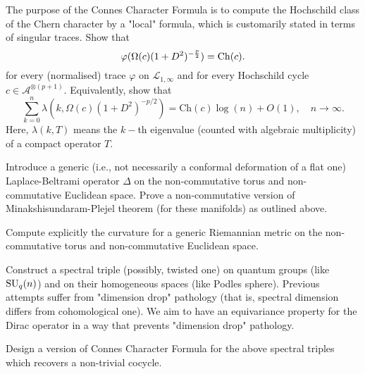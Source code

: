 \documentclass{article}
\newcommand{\archeading}[1]{\vspace{.3cm} \noindent{\bfseries #1} \vspace{.1cm}   }
\begin{document}
 The purpose of the Connes Character Formula is to compute the Hochschild class of the Chern character by a "local" formula, which is customarily  stated in terms of singular traces. Show that
\begin{equation}\label{super main eq}
\varphi(\Omega(c)(1+D^2)^{-\frac{p}{2}})={\rm Ch}(c).
\end{equation}
for every (normalised) trace $\varphi$ on $\mathcal{L}_{1,\infty}$ and for every Hochschild cycle $c\in\mathcal{A}^{\otimes (p+1)}.$ Equivalently, show that
$$\sum_{k=0}^n \lambda(k,\Omega(c)(1+D^2)^{-p/2}) = \mathrm{Ch}(c)\log(n)+O(1),\quad n\to\infty.$$
Here, $\lambda(k,T)$ means the $k-$th eigenvalue (counted with algebraic multiplicity) of a compact operator $T.$

 Introduce a generic (i.e., not necessarily a conformal deformation of a flat one) Laplace-Beltrami operator $\Delta$ on the non-commutative torus and non-commutative Euclidean space. Prove a non-commutative version of Minakshisundaram-Plejel theorem (for these manifolds) as outlined above.

 Compute explicitly the curvature for a generic Riemannian metric on the non-commutative torus and non-commutative Euclidean space.

 Construct a spectral triple (possibly, twisted one) on quantum groups (like ${\rm SU}_q(n)$) and on their homogeneous spaces (like Podles sphere). Previous attempts \cite{ChakrabortyPal} suffer from "dimension drop" pathology (that is, spectral dimension differs from cohomological one). We aim to have an equivariance property for the Dirac operator in a way that prevents "dimension drop" pathology. 

 Design a version of Connes Character Formula for the above spectral triples which recovers a non-trivial cocycle.

\bigskip\archeading{Future Fellowship Candidate}
\end{document}
